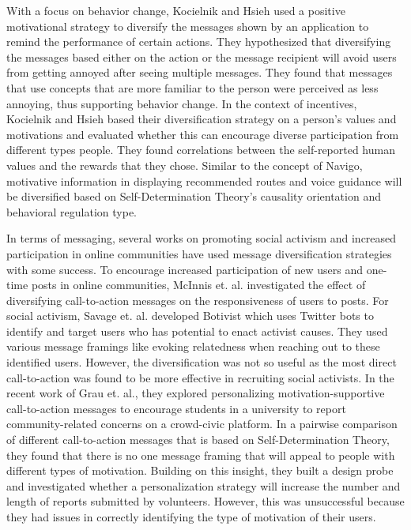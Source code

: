 With a focus on behavior change, Kocielnik and Hsieh\cite{kocielnik2017send} used a positive motivational strategy to diversify the messages shown by an application to remind the performance of certain actions. They hypothesized that diversifying the messages based either on the action or the message recipient will avoid users from getting annoyed after seeing multiple messages. They found that messages that use concepts that are more familiar to the person were perceived as less annoying, thus supporting behavior change. In the context of incentives, Kocielnik and Hsieh\cite{hsieh2016you} based their diversification strategy on a person's values and motivations and evaluated whether this can encourage diverse participation from different types people. They found correlations between the self-reported human values and the rewards that they chose. Similar to the concept of Navigo, motivative information in displaying recommended routes and voice guidance will be diversified based on Self-Determination Theory's causality orientation and behavioral regulation type.

In terms of messaging, several works on promoting social activism and increased participation in online communities have used message diversification strategies with some success. To encourage increased participation of new users and one-time posts in online communities, McInnis et. al.\cite{mcinnis2016one} investigated the effect of diversifying call-to-action messages on the responsiveness of users to posts. For social activism, Savage et. al.\cite{savage2016botivist} developed Botivist which uses Twitter bots to identify and target users who has potential to enact activist causes. They used various message framings like evoking relatedness when reaching out to these identified users. However, the diversification was not so useful as the most direct call-to-action was found to be more effective in recruiting social activists. In the recent work of Grau et. al.\cite{grau2018personalized}, they explored personalizing motivation-supportive call-to-action messages to encourage students in a university to report community-related concerns on a crowd-civic platform. In a pairwise comparison of different call-to-action messages that is based on Self-Determination Theory, they found that there is no one message framing that will appeal to people with different types of motivation. Building on this insight, they built a design probe and investigated whether a personalization strategy will increase the number and length of reports submitted by volunteers. However, this was unsuccessful because they had issues in correctly identifying the type of motivation of their users. 

